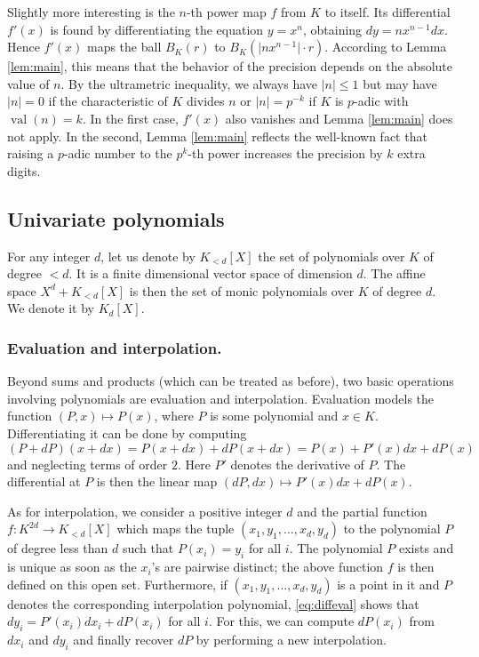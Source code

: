\documentclass{lms}
\DeclareMathOperator{\val}{val}
\begin{document}
Slightly more interesting is the $n$-th power map $f$ from $K$ to 
itself. Its differential $f'(x)$ is found by differentiating the 
equation $y = x^n$, obtaining $dy = n x^{n-1} dx$.
Hence $f'(x)$ maps the ball $B_K(r)$ to $B_K(\lvert nx^{n-1} \rvert \cdot r)$. According to Lemma \ref{lem:main}, this 
means that the behavior of the precision depends on the absolute value 
of $n$. By the ultrametric inequality, we always have $\lvert n \rvert \leq 1$ but 
may have $\lvert n \rvert = 0$ if the characteristic of $K$ divides $n$ or 
$\lvert n \rvert = p^{-k}$ if $K$ is $p$-adic with $\val(n) = k$.  In the first case,
$f'(x)$ also vanishes and Lemma \ref{lem:main} does 
not apply.  In the second, Lemma \ref{lem:main} reflects the well-known fact that
raising a $p$-adic number to the $p^k$-th power increases the precision 
by $k$ extra digits.

\subsection{Univariate polynomials}
\label{ssec:polynomials}

For any integer $d$, let us denote by $K_{< d}[X]$ the set of 
polynomials over $K$ of degree $< d$. It is a finite dimensional vector 
space of dimension $d$. The affine space $X^d + K_{< d}[X]$ is then 
the set of monic polynomials over $K$ of degree $d$. We denote it by 
$K_d[X]$.

\subsubsection*{Evaluation and interpolation.}

Beyond sums and products (which can be treated as before), two basic 
operations involving polynomials are evaluation and interpolation.
Evaluation models the function $(P,x) \mapsto P(x)$, where
$P$ is some polynomial and $x \in K$. Differentiating
it can be done by computing
\begin{equation}
\label{eq:diffeval}
(P + dP)(x + dx) = P(x + dx) + dP(x + dx) = P(x) + P'(x) dx + dP(x)
\end{equation}
and neglecting terms of order $2$. Here $P'$ denotes the derivative of 
$P$. The differential at $P$ is then the linear map $(dP, dx) \mapsto 
P'(x) dx + dP(x)$.

As for interpolation, we consider a positive integer $d$ and the partial 
function $f : K^{2d} \to K_{< d}[X]$ which maps the tuple $(x_1, y_1, 
\ldots, x_d, y_d)$ to the polynomial $P$ of degree less than $d$ such 
that $P(x_i) = y_i$ for all $i$. The polynomial $P$ exists and is unique 
as soon as the $x_i$'s are pairwise distinct; the above function $f$ is 
then defined on this open set. Furthermore, if $(x_1, y_1, \ldots, x_d, 
y_d)$ is a point in it and $P$ denotes the corresponding interpolation 
polynomial, \eqref{eq:diffeval} shows that $d y_i = P'(x_i) dx_i + 
dP(x_i)$ for all $i$. For this, we can compute $dP(x_i)$ from $d x_i$ 
and $d y_i$ and finally recover $dP$ by performing a new interpolation.
\end{document}
